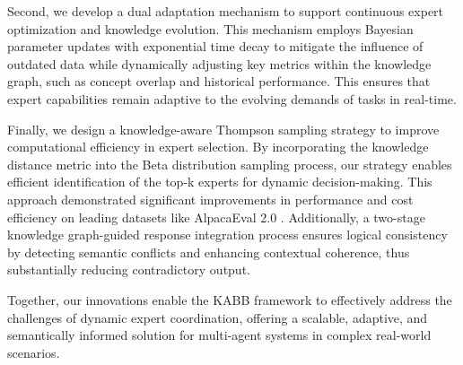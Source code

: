 Second, we develop a dual adaptation mechanism to support continuous expert optimization and knowledge evolution. This mechanism employs Bayesian parameter updates with exponential time decay to mitigate the influence of outdated data while dynamically adjusting key metrics within the knowledge graph, such as concept overlap and historical performance. This ensures that expert capabilities remain adaptive to the evolving demands of tasks in real-time.

Finally, we design a knowledge-aware Thompson sampling strategy to improve computational efficiency in expert selection. By incorporating the knowledge distance metric into the Beta distribution sampling process, our strategy enables efficient identification of the top-k experts for dynamic decision-making. This approach demonstrated significant improvements in performance and cost efficiency on leading datasets like AlpacaEval 2.0 \cite{dubois2024length}. 
Additionally, a two-stage knowledge graph-guided response integration process ensures logical consistency by detecting semantic conflicts and enhancing contextual coherence, thus substantially reducing contradictory output.

Together, our innovations enable the KABB framework to effectively address the challenges of dynamic expert coordination, offering a scalable, adaptive, and semantically informed solution for multi-agent systems in complex real-world scenarios.



